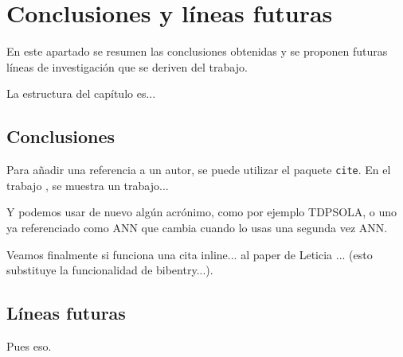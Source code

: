 %
%
%
% 
%
%
%
%

\chapter{Conclusiones y líneas futuras}
\label{cha:concl-y-line}

En este apartado se resumen las conclusiones obtenidas y se proponen
futuras líneas de investigación que se deriven del trabajo.

La estructura del capítulo es...


\section{Conclusiones}
\label{sec:conclusiones}

Para añadir una referencia a un autor, se puede utilizar el paquete
\texttt{cite}. En el trabajo \cite{armani03}, se muestra un trabajo...

Y podemos usar de nuevo algún acrónimo, como por ejemplo \ac{TDPSOLA}, o
uno ya referenciado como \ac{ANN} que cambia cuando lo usas una
segunda vez \ac{ANN}.

Veamos finalmente si funciona una cita inline... al paper de Leticia ... (esto substituye la funcionalidad de bibentry...).


\section{Líneas futuras}
\label{sec:lineas-futuras}

Pues eso.




